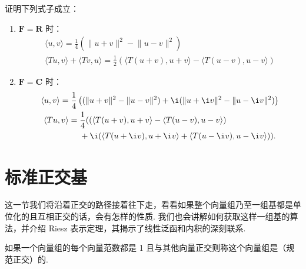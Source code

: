 \begin{example}
    证明下列式子成立：
    \begin{enumerate}
        \item $\mathbf{F} = \mathbf{R}$ 时：
              \begin{gather}
                  \label{eq:23:内积和范数的性质1}
                  \langle u, v\rangle = \frac{1}{4}\left( \lVert u + v \rVert^2 - \lVert u - v \rVert^2\right) \\
                  \label{eq:23:内积和范数的性质2}
                  \langle Tu, v\rangle + \langle Tv, u\rangle = \frac{1}{2}\left(\langle T(u + v), u + v\rangle - \langle T(u - v), u - v\rangle\right)
              \end{gather}

        \item $\mathbf{F} = \mathbf{C}$ 时：
              \begin{gather}
                  \label{eq:23:内积和范数的性质3}
                  \langle u, v\rangle = \frac{1}{4}\left((\lVert u + v \rVert^2 - \lVert u - v \rVert^2) + \i(\lVert u + \i v \rVert^2 - \lVert u - \i v \rVert^2)\right) \\
                  \label{eq:23:内积和范数的性质4}
                  \begin{aligned}
                      \langle Tu, v\rangle ={} & \frac{1}{4}  ((\langle T(u + v), u + v\rangle - \langle T(u - v), u - v\rangle)     \\
                                               & + \i(\langle T(u + \i v), u + \i v\rangle + \langle T(u - \i v), u - \i v\rangle)).
                  \end{aligned}
              \end{gather}
    \end{enumerate}

\end{example}

\section{标准正交基}

这一节我们将沿着正交的路径接着往下走，看看如果整个向量组乃至一组基都是单位化的且互相正交的话，会有怎样的性质. 我们也会讲解如何获取这样一组基的算法，并介绍 Riesz 表示定理，其揭示了线性泛函和内积的深刻联系.

\begin{definition} 
    如果一个向量组的每个向量范数都是 1 且与其他向量正交则称这个向量组是（规范正交）的.
\end{definition}

